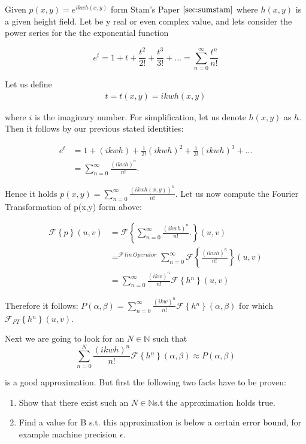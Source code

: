 Given $p(x,y)=e^{ikwh(x,y)}$ form Stam's Paper $\ref{sec:sumstam}$ where $h(x,y)$ is a given height field. Let be y real or even complex value, and lets consider the power series for the the exponential function
 
\begin{equation}
  e^{t}=1+t+\frac{t^{2}}{2!}+\frac{t^{3}}{3!}+...=\sum_{n=0}^{\infty}\frac{t^{n}}{n!}
\end{equation}

Let us define 
\begin{align}
t 
= t(x,y) 
= ikwh(x,y)
\end{align}
 
where $i$ is the imaginary number. For simplification, let us denote $h(x,y)$ as $h$. Then it follows by our previous stated identities: 

\begin{align}
 e^{t}
 &=1+(ikwh)+\frac{1}{2!}(ikwh)^{2}+\frac{1}{3!}(ikwh)^{3}+... \nonumber \\
 &=\sum_{n=0}^{\infty}\frac{(ikwh)^{n}}{n!}.
\end{align}

Hence it holds $p(x,y)=\sum_{n=0}^{\infty}\frac{(ikwh(x,y))^{n}}{n!}$. Let us now compute the Fourier Transformation of p(x,y) form above:

\begin{align}
  \mathcal{F}\left\{ p\right\}(u,v)
  & =\mathcal{F}\left\{ \sum_{n=0}^{\infty}\frac{(ikwh)^{n}}{n!}.\right\}(u,v) \nonumber \\
  & =^{\mathcal{F}\, lin\, Operator}\sum_{n=0}^{\infty}\mathcal{F}\left\{ \frac{(ikwh)^{n}}{n!}\right\}(u,v) \nonumber \\
  & =\sum_{n=0}^{\infty}\frac{(ikw)^{n}}{n!}\mathcal{F}\left\{ h{}^{n}\right\}(u,v)
\end{align}

Therefore it follows: $P(\alpha,\beta)=\sum_{n=0}^{\infty}\frac{(ikw)^{n}}{n!}\mathcal{F}\left\{ h{}^{n}\right\} (\alpha,\beta)$ for which $\mathcal{F}_{FT}\left\{ h{}^{n}\right\} (u,v)$.

Next we are going to look for an $N\mathbb{\in N}$ such that 
\begin{equation}
 \sum_{n=0}^{N}\frac{(ikwh)^{n}}{n!}\mathcal{F}\left\{ h{}^{n}\right\} (\alpha,\beta) \approx P(\alpha,\beta) 
\end{equation}

is a good approximation. But first the following two facts have to be proven:

\begin{enumerate}
\item Show that there exist such an $N\mathbb{\in N}$s.t the approximation
holds true.
\item Find a value for B s.t. this approximation is below a certain error
bound, for example machine precision $\epsilon$. 
\end{enumerate}

